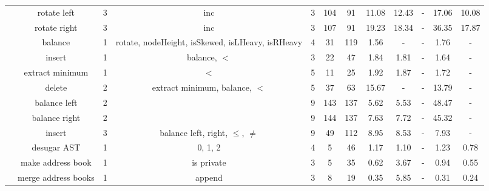 \documentclass[10pt,preprint]{sigplanconf-pldi16}
\theoremstyle{definition}
\newcommand{\tool}{\textsc{Synquid}\xspace}
\newcommand{\head}[1]{\emph{#1}}
\begin{document}
\begin{table*}[!htbp]
\begin{center}
{\begin{tabular}{@{} r|c| cccc | cccccc @{}}
\hline\multirow{6}{*}{\parbox{1cm}{\vspace{-0.85\baselineskip}}} & rotate left & 3 & inc & 3 & 104 & 91 & 11.08 & 12.43 & - & 17.06 & 10.08 \\
 & rotate right & 3 & inc & 3 & 107 & 91 & 19.23 & 18.34 & - & 36.35 & 17.87 \\
 & balance & 1 & rotate, nodeHeight, isSkewed, isLHeavy, isRHeavy & 4 & 31 & 119 & 1.56 & - & - & 1.76 & - \\
 & insert & 1 & balance, $<$ & 3 & 22 & 47 & 1.84 & 1.81 & - & 1.64 & - \\
 & extract minimum & 1 & $<$ & 5 & 11 & 25 & 1.92 & 1.87 & - & 1.72 & - \\
 & delete & 2 & extract minimum, balance, $<$ & 5 & 37 & 63 & 15.67 & - & - & 13.79 & - \\
\hline\multirow{3}{*}{\parbox{1cm}{\vspace{-0.85\baselineskip}}} & balance left & 2 &  & 9 & 143 & 137 & 5.62 & 5.53 & - & 48.47 & - \\
 & balance right & 2 &  & 9 & 144 & 137 & 7.63 & 7.72 & - & 45.32 & - \\
 & insert & 3 & balance left, right, $\leq$, $\neq$ & 9 & 49 & 112 & 8.95 & 8.53 & - & 7.93 & - \\
\hline\multirow{3}{*}{\parbox{1cm}{\vspace{-0.85\baselineskip}}} & desugar AST & 1 & 0, 1, 2 & 4 & 5 & 46 & 1.17 & 1.10 & - & 1.23 & 0.78 \\
 & make address book & 1 & is private & 3 & 5 & 35 & 0.62 & 3.67 & - & 0.94 & 0.55 \\
 & merge address books & 1 & append & 3 & 8 & 19 & 0.35 & 5.85 & - & 0.31 & 0.24 \\
\hline \end{tabular}
}
\end{center}
\caption{
Benchmarks and \tool results.
For each benchmark, we report the number of synthesis goals \head{\#G};
the set of provided \head{Components};
the number of defined measures \head{\#M};
cumulative size of \head{Spec}ification and synthesized \head{Code} (in AST nodes) for all goals;
as well as \tool running times (in seconds) with minimal bounds (\head{T-all}),
with default bounds (\head{T-def}),
without round-trip checking (\head{T-nrt}),
without type consistency checking (\head{T-ncc}),
and without \textsc{MUSFix} (\head{T-nmus}).
``-'' denotes timeout of 2 minutes or out of memory.
}
\label{fig:evaluation}
\end{table*}
\end{document}
